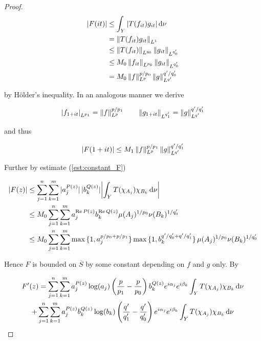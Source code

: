 \begin{proof}
\begin{gather*}
	\begin{aligned}
		\abs[0]{ F(it)} &\leq \int_Y \abs[0]{ T(f_{it})g_{it}} \d\nu\\
		&= \norm[0]{T(f_{it}) g_{it}}_{L^1}\\
		&\leq \norm[0]{T(f_{it})}_{L^{q_0}}\norm[0]{g_{it}}_{L^{q_0'}}\\
		&\leq M_0 \norm[0]{f_{it}}_{L^{p_0}} \norm[0]{g_{it}}_{L^{q_0'}}\\
		&= M_0 \norm[0]{f}_{L^p}^{p/p_0} \norm[0]g_{L^{q'}}^{q'/q'_0}
	\end{aligned}
\end{gather*}

\noindent by H\"older's inequality. In an analogous manner we derive
				
\begin{equation*}
	\abs[0]{f_{1 + it}}_{L^{p_1}} = \norm[0]{f}_{L^p}^{p/p_1} \qquad \norm[0]{g_{1 + it}}_{L^{q_1'}} = \norm[0]{g}_{L^{q'}}^{q'/q_1'}
\end{equation*}

\noindent and thus 
				
\begin{equation*}
	\abs[0]{ F(1 + it)} \leq M_1 \norm[0]{f}_{L^p}^{p/p_1}\norm[0]{g}_{L^{q'}}^{q'/q_1'}
\end{equation*}	

Further by estimate (\ref{est:constant_F}) 

\begin{equation*}
	\begin{aligned}
		\abs[0]{ F(z)} &\leq \sum_{j = 1}^n\sum_{k = 1}^m \abs[0]{ a_j^{P(z)}} \abs[0]{ b_k^{Q(z)}} \abs{\int_Y T(\chi_{A_j})\chi_{B_k} \d\nu}\\
		&\leq M_0\sum_{j = 1}^n\sum_{k = 1}^m a_j^{\Re P(z)}b_k^{\Re Q(z)}\mu(A_j)^{1/p_0}\nu(B_k)^{1/q_0'}\\
		&\leq M_0\sum_{j = 1}^n\sum_{k = 1}^m \max\cbr[0]{ 1, a_j^{p/p_0 + p/p_1}} \max\cbr[0]{1,b_k^{q'/q_0' + q'/q_1'}}\mu(A_j)^{1/p_0}\nu(B_k)^{1/q_0'}
	\end{aligned}
\end{equation*}


Hence $F$ is bounded on $\overline{S}$ by some constant depending on $f$ and $g$ only. By 

\begin{multline*}
	F'(z) = \sum_{j = 1}^n\sum_{k = 1}^m a^{P(z)}_j\log (a_j) \del{\frac{p}{p_1} - \frac{p}{p_0}} b_k^{Q(z)}e^{i\alpha_j} e^{i\beta_k} \int_YT(\chi_{A_j})\chi_{B_k}\d\nu \\
	+  \sum_{j = 1}^n\sum_{k = 1}^m a^{P(z)}_jb_k^{Q(z)}\log(b_k)\del{ \frac{q'}{q'_1} - \frac{q'}{q'_0}}e^{i\alpha_j} e^{i\beta_k} \int_YT(\chi_{A_j})\chi_{B_k}\d\nu 
\end{multline*}


\end{proof}
